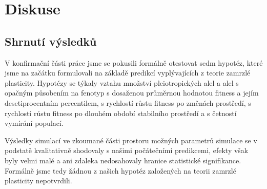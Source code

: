 \chapter{Diskuse}

%
%
%
%
%

\section{Shrnutí výsledků}

V konfirmační části práce jsme se pokusili formálně otestovat sedm hypotéz, které jsme na začátku formulovali
na základě predikcí vyplývajících z teorie zamrzlé plasticity.
Hypotézy se týkaly vztahu množství pleiotropických alel a alel s opačným působením na fenotyp s dosaženou průměrnou
hodnotou fitness a jejím desetiprocentním percentilem, s rychlostí růstu fitness po změnách prostředí, s rychlostí
růstu fitness po dlouhém období stabilního prostředí a s četností vymírání populací.

Výsledky simulací ve zkoumané části prostoru možných parametrů simulace se v podstatě kvalitativně shodovaly s
našimi počátečními predikcemi, efekty však byly velmi malé a ani zdaleka nedosahovaly hranice statistické signifikance.
Formálně jsme tedy žádnou z našich hypotéz založených na teorii zamrzlé plasticity nepotvrdili.

